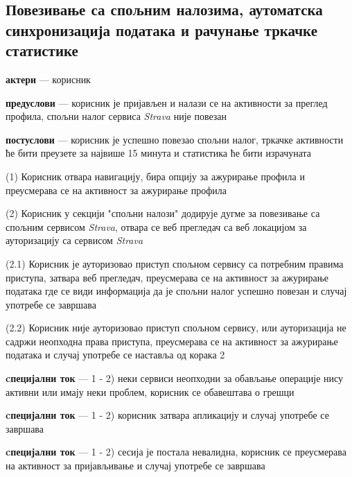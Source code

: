\documentclass[12pt,oneside]{memoir}
\begin{document}
\subsection{Повезивање са спољним налозима, аутоматска синхронизација података и рачунање тркачке статистике}
\begin{description}
    \item \textbf{актери} --- корисник
    \item \textbf{предуслови} --- корисник је пријављен и налази се на активности за преглед профила, спољни налог сервиса \textit{Strava} није повезан
    \item \textbf{постуслови} --- корисник је успешно повезао спољни налог, тркачке активности ће бити преузете за највише 15 минута и статистика ће бити израчуната
    \item (1) Корисник отвара навигацију, бира опцију за ажурирање профила и преусмерава се на активност за ажурирање профила
    \item (2) Корисник у секцији "спољни налози" додирује дугме за повезивање са спољним сервисом \textit{Strava}, отвара се веб прегледач са веб локацијом за ауторизацију са сервисом \textit{Strava}
    \begin{description}
        \item (2.1) Корисник је ауторизовао приступ спољном сервису са потребним правима приступа, затвара веб прегледач, преусмерава се на активност за ажурирање података где се види информација да је спољни налог успешно повезан и случај употребе се завршава
        \item (2.2) Корисник није ауторизовао приступ спољном сервису, или ауторизација не садржи неопходна права приступа, преусмерава се на активност за ажурирање података и случај употребе се наставља од корака 2
    \end{description}
    \item \textbf{cпецијални ток} --- 1 - 2) неки сервиси неопходни за обављање операције нису активни или имају неки проблем, корисник се обавештава о грешци
    \item \textbf{cпецијални ток} --- 1 - 2) корисник затвара апликацију и случај употребе се завршава
    \item \textbf{cпецијални ток} --- 1 - 2) сесија је постала невалидна, корисник се преусмерава на активност за пријављивање и случај употребе се завршава
\end{description}
\end{document}
